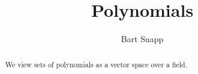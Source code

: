 \documentclass{ximera}
\author{Bart Snapp}
\title{Polynomials}
\begin{document}
\begin{abstract}
  We view sets of polynomials as a vector space over a field.
\end{abstract}
\maketitle
\end{document}
